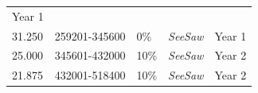 \documentclass[11pt,a4paperpaper,]{report}
\begin{document}
\begin{longtable}[]{@{}llllc@{}}
\begin{minipage}[t]{0.12\columnwidth}
Year 1\strut
\end{minipage}\tabularnewline
\begin{minipage}[t]{0.12\columnwidth}\raggedright\strut
31.250\strut
\end{minipage} & \begin{minipage}[t]{0.19\columnwidth}\raggedright\strut
259201-345600\strut
\end{minipage} & \begin{minipage}[t]{0.14\columnwidth}\raggedright\strut
0\%\strut
\end{minipage} & \begin{minipage}[t]{0.25\columnwidth}\raggedright\strut
\textit{SeeSaw}\strut
\end{minipage} & \begin{minipage}[t]{0.12\columnwidth}\centering\strut
Year 1\strut
\end{minipage}\tabularnewline
\begin{minipage}[t]{0.12\columnwidth}\raggedright\strut
25.000\strut
\end{minipage} & \begin{minipage}[t]{0.19\columnwidth}\raggedright\strut
345601-432000\strut
\end{minipage} & \begin{minipage}[t]{0.14\columnwidth}\raggedright\strut
10\%\strut
\end{minipage} & \begin{minipage}[t]{0.25\columnwidth}\raggedright\strut
\textit{SeeSaw}\strut
\end{minipage} & \begin{minipage}[t]{0.12\columnwidth}\centering\strut
Year 2\strut
\end{minipage}\tabularnewline
\begin{minipage}[t]{0.12\columnwidth}\raggedright\strut
21.875\strut
\end{minipage} & \begin{minipage}[t]{0.19\columnwidth}\raggedright\strut
432001-518400\strut
\end{minipage} & \begin{minipage}[t]{0.14\columnwidth}\raggedright\strut
10\%\strut
\end{minipage} & \begin{minipage}[t]{0.25\columnwidth}\raggedright\strut
\textit{SeeSaw}\strut
\end{minipage} & \begin{minipage}[t]{0.12\columnwidth}\centering\strut
Year 2\strut
\end{minipage}\tabularnewline

\end{longtable}
\end{document}
